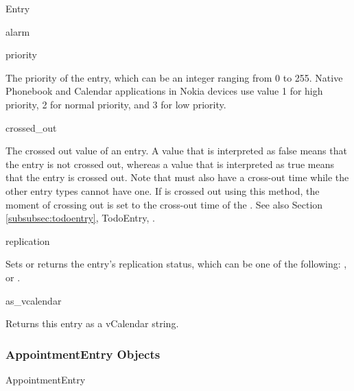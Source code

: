 \begin{classdesc*}{Entry}
\begin{memberdesc}[Entry]{alarm}
\end{memberdesc}

\begin{memberdesc}[Entry]{priority}

The priority of the entry, which can be an integer ranging from 0 to 255. Native 
Phonebook and Calendar applications in Nokia devices use value 1 for high 
priority, 2 for normal priority, and 3 for low priority. 

\end{memberdesc}

\begin{memberdesc}[Entry]{crossed_out}

The crossed out value of an entry. A value that is interpreted as false means 
that the entry is not crossed out, whereas a value that is interpreted as true 
means that the entry is crossed out. Note that  must also 
have a cross-out time while the other entry types cannot have one. If 
 is crossed out using this method, the moment of crossing out 
is set to the cross-out time of the . See also Section 
\ref{subsubsec:todoentry}, TodoEntry, .

\end{memberdesc}

\begin{memberdesc}[Entry]{replication}

Sets or returns the entry's replication status, which can be one of the 
following: ,  or .

\end{memberdesc}

\begin{methoddesc}[Entry]{as_vcalendar}{}

Returns this entry as a vCalendar string.

\end{methoddesc}

\end{classdesc*}

\subsubsection{AppointmentEntry Objects}
\label{subsubsec:appointmententry}

\begin{classdesc*}{AppointmentEntry}
\end{classdesc*}

